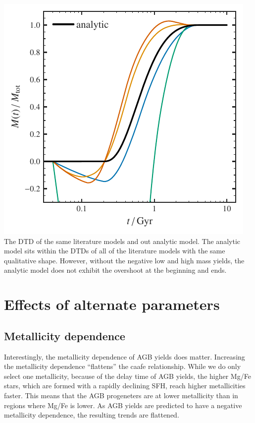 \includegraphics{figures/agb_ana_dtd.pdf}\\
The DTD of the same literature models and out analytic model. The
analytic model sits within the DTDs of all of the literature models with
the same qualitative shape. However, without the negative low and high
mass yields, the analytic model does not exhibit the overshoot at the
beginning and ends.

\hypertarget{effects-of-alternate-parameters}{%
\section{Effects of alternate
parameters}\label{effects-of-alternate-parameters}}

\hypertarget{metallicity-dependence}{%
\subsection{Metallicity dependence}\label{metallicity-dependence}}

Interestingly, the metallicity dependence of AGB yields does matter.
Increasing the metallicity dependence ``flattens'' the caafe
relationship. While we do only select one metallicity, because of the
delay time of AGB yields, the higher Mg/Fe stars, which are formed with
a rapidly declining SFH, reach higher metallicities faster. This means
that the AGB progeneters are at lower metallicity than in regions where
Mg/Fe is lower. As AGB yields are predicted to have a negative
metallicity dependence, the resulting trends are flattened.

